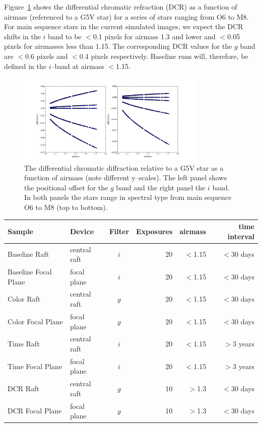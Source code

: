\documentclass[prd, nofootinbib, floatfix, 11pt,tightenlines,times]{article}
\begin{document}
Figure~\ref{DCR} shows the differential chromatic refraction (DCR) as
a function of airmass (referenced to a G5V star) for a series of stars
ranging from O6 to M8. For main sequence stars in the current
simulated images, we expect the DCR shifts in the $i$ band to be
$<$0.1 pixels for airmass 1.3 and lower and $<$0.05 pixels for
airmasses less than 1.15. The corresponding DCR values for the $g$
band are $<$0.6 pixels and $<$0.4 pixels respectively. Baseline runs
will, therefore, be defined in the $i$--band at airmass $<$1.15.

\begin{figure}
\centerline{\includegraphics[width=0.8\textwidth]{Figures/DCR_R_stars.png}}
\caption{The differential chromatic diffraction relative to a G5V star
  as a function of airmass (note different y--scales). The left panel shows the positional offset
  for the $g$ band and the right panel the $i$ band. In both panels
  the stars range in spectral type from main sequence O6 to M8 (top to bottom).}
\label{DCR}
\end{figure}


\begin{table}
\begin{center}
\begin{tabular}{llcrrr}
Sample & Device & Filter & Exposures & airmass & time interval \\
\hline  
Baseline Raft              & central raft  & $i$  & 20 & $<$1.15 &$<$30 days \\
Baseline Focal Plane   & focal plane  &  $i$ & 20 & $<$1.15 &$<$30
days \\
\hline  
Color Raft              & central raft  & $g$  & 20 & $<$1.15 &$<$30 days \\
Color Focal Plane   & focal plane  &  $g$ & 20 & $<$1.15 &$<$30 days \\
\hline 
Time Raft              & central raft  & $i$  & 20 & $<$1.15 &$>$3 years \\
Time Focal Plane   & focal plane  &  $i$ & 20 & $<$1.15 &$>$3 years \\
\hline 
DCR Raft              & central raft  & $g$  & 10 & $>$1.3 &$<$30 days \\
DCR Focal Plane   & focal plane  & $g$  & 10 & $>$1.3 &$<$30 days
\end{tabular}
\end{center}
\end{table}
\end{document}

